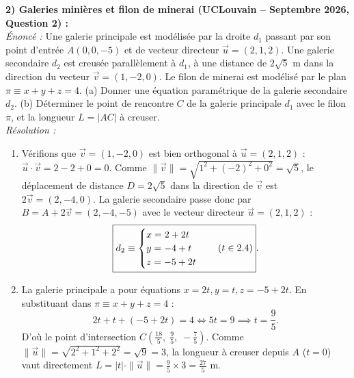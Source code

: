 \begin{exemple}
\medskip
\textbf{2) Galeries minières et filon de minerai (UCLouvain -- Septembre 2026, Question 2) :}\\
\emph{Énoncé :} Une galerie principale est modélisée par la droite $d_1$ passant par son point d'entrée $A(0, 0, -5)$ et de vecteur directeur $\vec{u} = (2, 1, 2)$. Une galerie secondaire $d_2$ est creusée parallèlement à $d_1$, à une distance de $2\sqrt{5}\text{ m}$ dans la direction du vecteur $\vec{v} = (1, -2, 0)$. Le filon de minerai est modélisé par le plan $\pi \equiv x + y + z = 4$. (a) Donner une équation paramétrique de la galerie secondaire $d_2$. (b) Déterminer le point de rencontre $C$ de la galerie principale $d_1$ avec le filon $\pi$, et la longueur $L = |AC|$ à creuser.\\
\emph{Résolution :}
\begin{enumerate}[label=(\alph*)]
    \item Vérifions que $\vec{v} = (1, -2, 0)$ est bien orthogonal à $\vec{u} = (2, 1, 2)$ : $\vec{u}\cdot\vec{v} = 2 - 2 + 0 = 0$. Comme $\|\vec{v}\| = \sqrt{1^2+(-2)^2+0^2} = \sqrt{5}$, le déplacement de distance $D = 2\sqrt{5}$ dans la direction de $\vec{v}$ est $2\vec{v} = (2, -4, 0)$. La galerie secondaire passe donc par $B = A + 2\vec{v} = (2, -4, -5)$ avec le vecteur directeur $\vec{u} = (2, 1, 2)$ :
    \[
        \boxed{d_2 \equiv \begin{cases} x = 2 + 2t \\ y = -4 + t \\ z = -5 + 2t \end{cases} \quad (t \in 2.4)}.
    \]
    \item La galerie principale a pour équations $x = 2t, y = t, z = -5 + 2t$. En substituant dans $\pi \equiv x + y + z = 4$ :
    \[
        2t + t + (-5 + 2t) = 4 \iff 5t = 9 \implies t = \frac{9}{5}.
    \]
    D'où le point d'intersection $\boxed{C\left(\frac{18}{5},\; \frac{9}{5},\; -\frac{7}{5}\right)}$. Comme $\|\vec{u}\| = \sqrt{2^2+1^2+2^2} = \sqrt{9} = 3$, la longueur à creuser depuis $A$ ($t=0$) vaut directement $L = |t|\cdot\|\vec{u}\| = \frac{9}{5} \times 3 = \boxed{\frac{27}{5}\text{ m}}$.
\end{enumerate}


\end{exemple}
